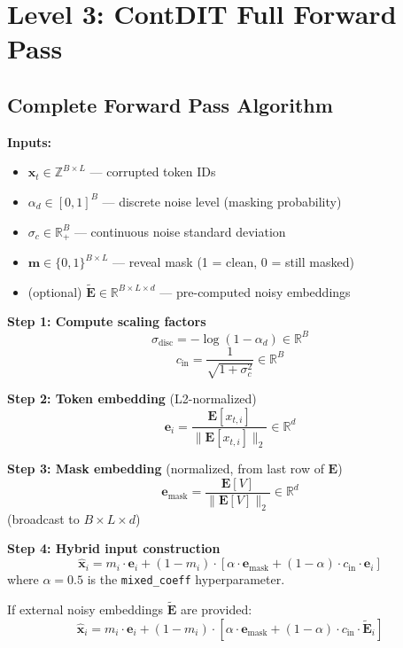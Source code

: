 \documentclass[11pt,a4paper]{article}
\begin{document}
\newpage

\section{Level 3: ContDIT Full Forward Pass}

\subsection{Complete Forward Pass Algorithm}

\noindent\textbf{Inputs:}
\begin{itemize}
    \item $\mathbf{x}_t \in \mathbb{Z}^{B \times L}$ --- corrupted token IDs
    \item $\alpha_d \in [0,1]^B$ --- discrete noise level (masking probability)
    \item $\sigma_c \in \mathbb{R}_+^B$ --- continuous noise standard deviation
    \item $\mathbf{m} \in \{0,1\}^{B \times L}$ --- reveal mask (1 = clean, 0 = still masked)
    \item (optional) $\tilde{\mathbf{E}} \in \mathbb{R}^{B \times L \times d}$ --- pre-computed noisy embeddings
\end{itemize}

\noindent\textbf{Step 1: Compute scaling factors}
\[
\sigma_{\text{disc}} = -\log(1 - \alpha_d) \in \mathbb{R}^B
\]
\[
c_{\text{in}} = \frac{1}{\sqrt{1 + \sigma_c^2}} \in \mathbb{R}^B
\]

\noindent\textbf{Step 2: Token embedding} (L2-normalized)
\[
\mathbf{e}_i = \frac{\mathbf{E}[x_{t,i}]}{\|\mathbf{E}[x_{t,i}]\|_2} \in \mathbb{R}^d
\]

\noindent\textbf{Step 3: Mask embedding} (normalized, from last row of $\mathbf{E}$)
\[
\mathbf{e}_{\text{mask}} = \frac{\mathbf{E}[V]}{\|\mathbf{E}[V]\|_2} \in \mathbb{R}^d
\]
(broadcast to $B \times L \times d$)

\noindent\textbf{Step 4: Hybrid input construction}
\[
\hat{\mathbf{x}}_i = m_i \cdot \mathbf{e}_i + (1 - m_i) \cdot \left[\alpha \cdot \mathbf{e}_{\text{mask}} + (1 - \alpha) \cdot c_{\text{in}} \cdot \mathbf{e}_i\right]
\]
where $\alpha = 0.5$ is the \texttt{mixed\_coeff} hyperparameter.

If external noisy embeddings $\tilde{\mathbf{E}}$ are provided:
\[
\hat{\mathbf{x}}_i = m_i \cdot \mathbf{e}_i + (1 - m_i) \cdot \left[\alpha \cdot \mathbf{e}_{\text{mask}} + (1 - \alpha) \cdot c_{\text{in}} \cdot \tilde{\mathbf{E}}_i\right]
\]
\end{document}
